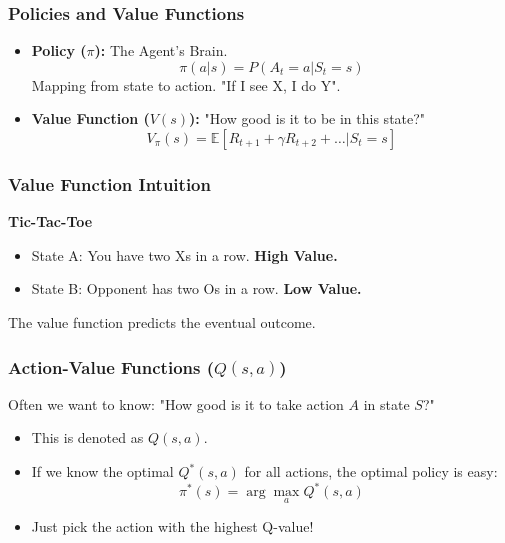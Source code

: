 \documentclass[aspectratio=169]{beamer}
\begin{document}
\begin{frame}
    \frametitle{Policies and Value Functions}
    \begin{itemize}
        \item \textbf{Policy ($\pi$):} The Agent's Brain.
        $$ \pi(a|s) = P(A_t=a | S_t=s) $$
        Mapping from state to action. "If I see X, I do Y".

        \item \textbf{Value Function ($V(s)$):}
        "How good is it to be in this state?"
        $$ V_\pi(s) = \mathbb{E}[R_{t+1} + \gamma R_{t+2} + \dots | S_t = s] $$
    \end{itemize}
\end{frame}

\begin{frame}
    \frametitle{Value Function Intuition}
    \centering
    \textbf{Tic-Tac-Toe}
    \vspace{0.5cm}

    \begin{itemize}
        \item State A: You have two Xs in a row. \textbf{High Value.}
        \item State B: Opponent has two Os in a row. \textbf{Low Value.}
    \end{itemize}

    The value function predicts the eventual outcome.
\end{frame}

\begin{frame}
    \frametitle{Action-Value Functions ($Q(s, a)$)}
    Often we want to know: "How good is it to take action $A$ in state $S$?"
    \vspace{0.5cm}
    \begin{itemize}
        \item This is denoted as $Q(s, a)$.
        \item If we know the optimal $Q^*(s, a)$ for all actions, the optimal policy is easy:
        $$ \pi^*(s) = \arg\max_a Q^*(s, a) $$
        \item Just pick the action with the highest Q-value!
    \end{itemize}
\end{frame}
\end{document}
